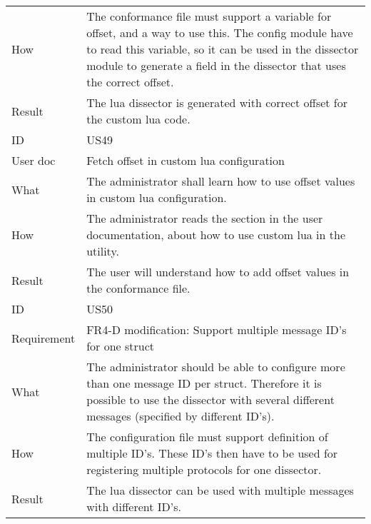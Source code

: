 \begin{table}[htbp]
{\begin{tabularx}{1.2\textwidth}{l X}
	How & The conformance file must support a variable for offset, and a way to use this. The config module have to read this variable, so it can be used in the \gls{dissector} module to generate a field in the \gls{dissector} that uses the correct offset. \\
	Result & The \Gls{lua} \gls{dissector} is generated with correct offset for the custom \Gls{lua} code. \\	
	\midrule
	ID & US49 \\
	User doc & Fetch offset in custom \Gls{lua} configuration  \\
	What & The administrator shall learn how to use offset values in custom \Gls{lua} configuration.   \\
	How & The administrator reads the section in the user documentation, about how to use custom \Gls{lua} in the \gls{utility}.  \\
	Result & The user will understand how to add offset values in the conformance file. \\
	\midrule
	ID & US50 \\
	Requirement & FR4-D modification: Support multiple message ID's for one \gls{struct} \\
	What & The administrator should be able to configure more than one message ID per \gls{struct}. Therefore it is possible to use the \gls{dissector} with several different messages (specified by different ID’s).    \\
	How & The configuration file must support definition of multiple ID’s. These ID’s then have to be used for registering multiple \glspl{protocol} for one \gls{dissector}.  \\
	Result & The \Gls{lua} \gls{dissector} can be used with multiple messages with different ID’s. \\
	\bottomrule
\end{tabularx}}
\end{table}

